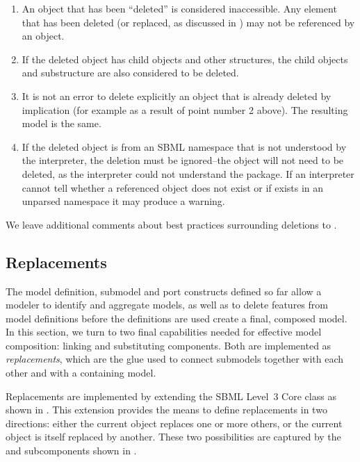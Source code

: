 \begin{enumerate}

\item An object that has been ``deleted'' is considered inaccessible.
  Any element that has been deleted (or replaced, as discussed in
  ) may not be referenced by an \SBaseRef object.

\item If the deleted object has child objects and other structures, the
  child objects and substructure are also considered to be deleted.

\item It is not an error to delete explicitly an object that is already
  deleted by implication (for example as a result of point number 2
  above).  The resulting model is the same.

\item If the deleted object is from an SBML namespace that is not
  understood by the interpreter, the deletion must be ignored--the 
  object will not need to be deleted, as the interpreter could not
  understand the package.  If an interpreter cannot tell whether 
  a referenced object does not exist or if exists in an unparsed namespace
  it may produce a warning.

\end{enumerate}

We leave additional comments about best practices surrounding deletions
to .

\clearpage


\subsection{Replacements}
\label{replacements}
\label{extended-sbase-class}

The model definition, submodel and port constructs defined so far allow
a modeler to identify and aggregate models, as well as to delete
features from model definitions before the definitions are used create a
final, composed model.  In this section, we turn to two final
capabilities needed for effective model composition: linking and
substituting components.  Both are implemented as \emph{replacements},
which are the glue used to connect submodels together with each other
and with a containing model.

Replacements are implemented by extending the SBML Level~3 Core \SBase
class as shown in .  This extension provides the
means to define replacements in two directions: either the current
object replaces one or more others, or the current object is itself
replaced by another.  These two possibilities are captured by the
 and  subcomponents
shown in .

